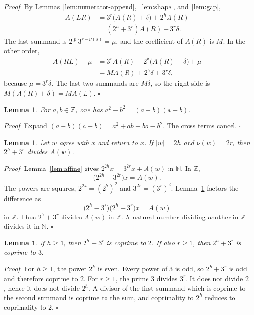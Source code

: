 \documentclass[11pt,letterpaper]{article}
\newcommand{\N}{\mathbb{N}}
\newcommand{\Z}{\mathbb{Z}}
\newtheorem{lemma}[theorem]{Lemma}
\newenvironment{proof}{\noindent\textit{Proof.}}{\hfill\(\square\)}
\begin{document}
\begin{proof}
By Lemmas~\ref{lem:numerator-append},~\ref{lem:shape}, and~\ref{lem:gap},
\begin{align*}
A(LR)
&=3^{r}\bigl(A(R)+\delta\bigr)+2^{h}A(R)\\
&=(2^{h}+3^{r})A(R)+3^{r}\delta.
\end{align*}
The last summand is \(2^{|p|}3^{r+\nu(s)}=\mu\), and the coefficient of \(A(R)\) is \(M\). In the other order,
\begin{align*}
A(RL)+\mu
&=3^{r}A(R)+2^{h}\bigl(A(R)+\delta\bigr)+\mu\\
&=MA(R)+2^{h}\delta+3^{r}\delta,
\end{align*}
because \(\mu=3^{r}\delta\). The last two summands are \(M\delta\), so the right side is \(M(A(R)+\delta)=MA(L)\).
\end{proof}

\begin{lemma}
\label{lem:squares}
For \(a,b\in\Z\), one has \(a^{2}-b^{2}=(a-b)(a+b)\).
\end{lemma}

\begin{proof}
Expand \((a-b)(a+b)=a^{2}+ab-ba-b^{2}\). The cross terms cancel.
\end{proof}

\begin{lemma}
\label{lem:closed}
Let \(w\) agree with \(x\) and return to \(x\). If \(|w|=2h\) and \(\nu(w)=2r\), then \(2^{h}+3^{r}\) divides \(A(w)\).
\end{lemma}

\begin{proof}
Lemma~\ref{lem:affine} gives \(2^{2h}x=3^{2r}x+A(w)\) in \(\N\). In \(\Z\),
\[
\bigl(2^{2h}-3^{2r}\bigr)x=A(w).
\]
The powers are squares, \(2^{2h}=(2^{h})^{2}\) and \(3^{2r}=(3^{r})^{2}\). Lemma~\ref{lem:squares} factors the difference as
\[
\bigl(2^{h}-3^{r}\bigr)\bigl(2^{h}+3^{r}\bigr)x=A(w)
\]
in \(\Z\). Thus \(2^{h}+3^{r}\) divides \(A(w)\) in \(\Z\). A natural number dividing another in \(\Z\) divides it in \(\N\).
\end{proof}

\begin{lemma}
\label{lem:coprime}
If \(h\ge 1\), then \(2^{h}+3^{r}\) is coprime to \(2\). If also \(r\ge 1\), then \(2^{h}+3^{r}\) is coprime to \(3\).
\end{lemma}

\begin{proof}
For \(h\ge 1\), the power \(2^{h}\) is even. Every power of \(3\) is odd, so \(2^{h}+3^{r}\) is odd and therefore coprime to \(2\). For \(r\ge 1\), the prime \(3\) divides \(3^{r}\). It does not divide \(2\), hence it does not divide \(2^{h}\). A divisor of the first summand which is coprime to the second summand is coprime to the sum, and coprimality to \(2^{h}\) reduces to coprimality to \(2\).
\end{proof}
\end{document}
